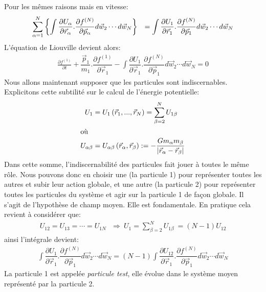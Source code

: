 Pour les mêmes raisons mais en vitesse:
\begin{align*}%
	\begin{array}[c]{ll}%
		\displaystyle\sum\limits_{\alpha=1}^{N}\left\{  \displaystyle\int%
		\dfrac{\partial U_{\alpha}}{\partial\vec{r}_{\alpha}}.\dfrac{\partial
		f^{(N)}}{\partial\vec{p}_{\alpha}}d\vec{w}_{2}\cdots d\vec{w}%
		_{N}\right\}   & =\displaystyle\int\dfrac{\partial U_{1}}{\partial
		\vec{r}_{1}}.\dfrac{\partial f^{(N)}}{\partial\vec{p}_{1}}%
		d\vec{w}_{2}\cdots d\vec{w}_{N}%
	\end{array}
\end{align*}
L'équation de Liouville devient alors:
\begin{align*}
	\frac{\partial f^{(1)}}{\partial t}+\dfrac{\vec{p}_{1}}{m_{1}}.\dfrac{\partial f^{(1)}}{\partial\vec{r}_{1}}-\displaystyle\int%
	\dfrac{\partial U_{1}}{\partial\vec{r}_{1}}.\dfrac{\partial f^{(N)}}{\partial\vec{p}_{1}}d\vec{w}_{2}\cdots d\vec{w}_{N}=0
\end{align*}
Nous allons maintenant supposer que les particules sont indiscernables.
Explicitons cette subtilité sur le calcul de l'énergie potentielle:
\begin{align*}
	U_{1} &  =U_{1}\left(  \vec{r}_{1},...,\vec{r}_{N}\right)  =\sum_{\beta=2}^{N}U_{1\beta}\\
	\intertext{où}
	U_{\alpha\beta} &  =U_{\alpha\beta}\left(  \vec{r}_{\alpha},\vec{r}_{\beta}\right)  :=-\frac{Gm_{\alpha}m_{\beta}}{\left\vert\vec{r}_{\alpha}-\vec{r}_{\beta}\right\vert }%
\end{align*}
Dans cette somme, l'indiscernabilité des particules fait jouer à toutes le même rôle. Nous pouvons donc en choisir une (la particule 1) pour représenter
toutes les autres et subir leur action globale, et une autre (la particule 2) pour représenter toutes les particules du système et agir sur la
particule 1 de façon globale. Il s'agit de l'hypothèse de champ moyen. Elle est fondamentale. En pratique cela revient à considérer que:
\begin{align*}
	U_{12}=U_{13}=\cdots=U_{1N}\ \ \ \Rightarrow\ U_{1}=\sum_{\beta=2}^{N}U_{1\beta}\ =\left(  N-1\right)  U_{12}
\end{align*}
ainsi l'intégrale devient:
\begin{align*}
	\displaystyle\int\dfrac{\partial U_{1}}{\partial\vec{r}_{1}}.\dfrac{\partial f^{(N)}}{\partial\vec{p}_{1}}d\vec{w}_{2}\cdots d\vec{w}%
	_{N}=\left(  N-1\right)  \displaystyle\int\dfrac{\partial U_{12}}{\partial\vec{r}_{1}}.\dfrac{\partial f^{(N)}}{\partial\vec{p}_{1}%
	}d\vec{w}_{2}\cdots d\vec{w}_{N}%
\end{align*}
La particule 1 est appelée \og\emph{particule test}\fg, elle évolue dans le système moyen représenté par la particule 2.

